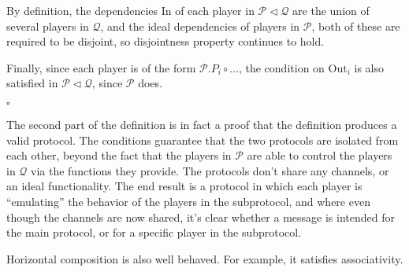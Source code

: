 \begin{definition}
By definition, the dependencies $\text{In}$ of each player in $\mathscr{P} \lhd \mathscr{Q}$
are the union of several players in $\mathscr{Q}$, and
the ideal dependencies of players in $\mathscr{P}$,
both of these are required to be disjoint, so disjointness property
continues to hold.

Finally, since each player is of the form $\mathscr{P}.P_i \circ \ldots$,
the condition on $\text{Out}_i$ is also satisfied in $\mathscr{P} \lhd \mathscr{Q}$,
since $\mathscr{P}$ does.

$\square$

\end{definition}

The second part of the definition is in fact a proof that the definition
produces a valid protocol.
The conditions guarantee that the two protocols are isolated
from each other, beyond the fact that the players in $\mathscr{P}$
are able to control the players in $\mathscr{Q}$ via the functions they provide.
The protocols don't share any channels, or an ideal functionality.
The end result is a protocol in which each player
is ``emulating'' the behavior of the players in the subprotocol,
and where even though the channels are now shared, it's clear
whether a message is intended for the main protocol,
or for a specific player in the subprotocol.

Horizontal composition is also well behaved.
For example, it satisfies associativity.

